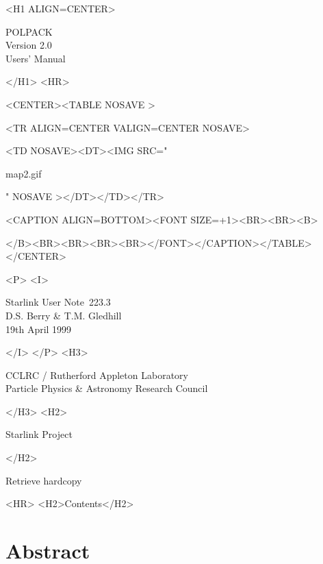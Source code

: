 \documentclass[twoside,11pt]{article}
\newcommand{\stardoccategory}  {Starlink User Note}
\newcommand{\stardocsource}    {sun\stardocnumber}
\newcommand{\stardocnumber}    {223.3}
\newcommand{\stardocauthors}   {D.S. Berry \& T.M. Gledhill }
\newcommand{\stardocdate}      {19th April 1999}
\newcommand{\stardoctitle}     {POLPACK}
\newcommand{\stardocversion}   {Version 2.0}
\newcommand{\stardocmanual}    {Users' Manual}
\newcommand{\htmladdnormallink}[2]{#1}
\newcommand{\htmladdimg}[1]{}
\newcommand{\htmlref}[2]{#1}
\newcommand{\htmladdtonavigation}[1]{}
\newcommand{\xlabel}[1]{}
\renewcommand{\_}{\texttt{\symbol{95}}}
\newcommand{\htmlfig}[3]{
   \label{#1}
   \begin{rawhtml} <CENTER><TABLE NOSAVE > \end{rawhtml}
   \begin{rawhtml} <TR ALIGN=CENTER VALIGN=CENTER NOSAVE> \end{rawhtml}
   \begin{rawhtml} <TD NOSAVE><DT><IMG SRC=" \end{rawhtml}
   #2
   \begin{rawhtml} " NOSAVE ></DT></TD></TR> \end{rawhtml}
   \begin{rawhtml} <CAPTION ALIGN=BOTTOM><FONT SIZE=+1><BR><BR><B> \end{rawhtml}
   #3 
   \begin{rawhtml} </B><BR><BR><BR><BR></FONT></CAPTION></TABLE></CENTER> \end{rawhtml}
}
\begin{document}
\begin{htmlonly}
   \xlabel{}
   \begin{rawhtml} <H1 ALIGN=CENTER> \end{rawhtml}
      \stardoctitle\\
      \stardocversion\\
      \stardocmanual
   \begin{rawhtml} </H1> <HR> \end{rawhtml}

   \htmlfig{map2}{map2.gif}{}

   \begin{rawhtml} <P> <I> \end{rawhtml}
   \stardoccategory\ \stardocnumber \\
   \stardocauthors \\
   \stardocdate
   \begin{rawhtml} </I> </P> <H3> \end{rawhtml}
      \htmladdnormallink{CCLRC}{http://www.cclrc.ac.uk} /
      \htmladdnormallink{Rutherford Appleton Laboratory}
                        {http://www.cclrc.ac.uk/ral} \\
      \htmladdnormallink{Particle Physics \& Astronomy Research Council}
                        {http://www.pparc.ac.uk} \\
   \begin{rawhtml} </H3> <H2> \end{rawhtml}
      \htmladdnormallink{Starlink Project}{http://www.starlink.rl.ac.uk/}
   \begin{rawhtml} </H2> \end{rawhtml}
   \htmladdnormallink{\htmladdimg{source.gif} Retrieve hardcopy}
      {http://www.starlink.rl.ac.uk/cgi-bin/hcserver?\stardocsource}\\

  \label{stardoccontents}
  \begin{rawhtml} 
    <HR>
    <H2>Contents</H2>
  \end{rawhtml}
  \htmladdtonavigation{\htmlref{\htmladdimg{contents_motif.gif}}
        {stardoccontents}}

  \section{\xlabel{abstract}Abstract}
\end{htmlonly}
\end{document}
